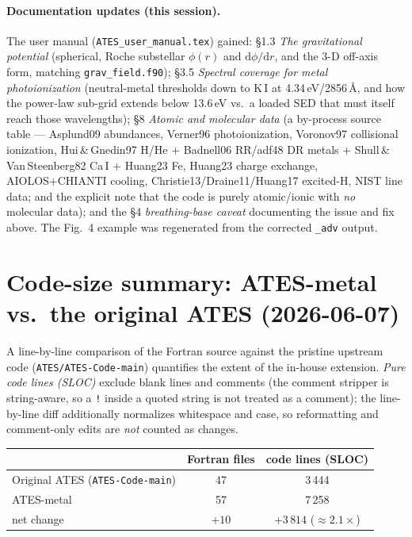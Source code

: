 \documentclass[english,a4paper]{kiseon_memo}
\begin{document}
\paragraph{Documentation updates (this session).} The user manual
(\texttt{ATES\_user\_manual.tex}) gained: \S1.3 \emph{The gravitational potential}
(spherical, Roche substellar $\phi(r)$ and $\mathrm d\phi/\mathrm dr$, and the 3-D
off-axis form, matching \texttt{grav\_field.f90}); \S3.5 \emph{Spectral coverage
for metal photoionization} (neutral-metal thresholds down to K\,I at
4.34\,eV/2856\,\AA, and how the power-law sub-grid extends below 13.6\,eV vs.\ a
loaded SED that must itself reach those wavelengths); \S8 \emph{Atomic and
molecular data} (a by-process source table --- Asplund09 abundances, Verner96
photoionization, Voronov97 collisional ionization, Hui\,\&\,Gnedin97 H/He +
Badnell06 RR/adf48 DR metals + Shull\,\&\,Van\,Steenberg82 Ca\,I + Huang23 Fe,
Huang23 charge exchange, AIOLOS+CHIANTI cooling, Christie13/Draine11/Huang17
excited-H, NIST line data; and the explicit note that the code is purely
atomic/ionic with \emph{no} molecular data); and the \S4 \emph{breathing-base
caveat} documenting the issue and fix above. The Fig.~4 example was regenerated
from the corrected \texttt{\_adv} output.

\section{Code-size summary: ATES-metal vs.\ the original ATES (2026-06-07)}
A line-by-line comparison of the Fortran source against the pristine upstream code
(\texttt{ATES/ATES-Code-main}) quantifies the extent of the in-house extension.
\emph{Pure code lines (SLOC)} exclude blank lines and comments (the comment
stripper is string-aware, so a \texttt{!} inside a quoted string is not treated as
a comment); the line-by-line diff additionally normalizes whitespace and case, so
reformatting and comment-only edits are \emph{not} counted as changes.

\begin{center}\small
\begin{tabular}{@{}lcc@{}}
\toprule
 & Fortran files & code lines (SLOC) \\
\midrule
Original ATES (\texttt{ATES-Code-main}) & 47 & 3\,444 \\
ATES-metal                              & 57 & 7\,258 \\
\midrule
net change & $+10$ & $+3\,814$ ($\approx2.1\times$) \\
\bottomrule
\end{tabular}
\end{center}
\end{document}
